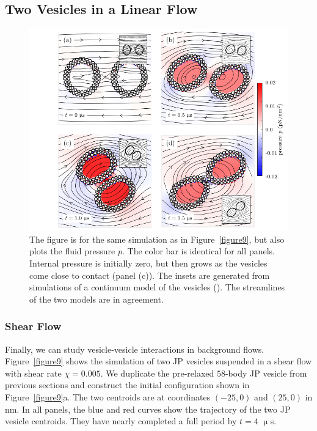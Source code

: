 \documentclass[lineno]{jfm}
\begin{document}
\subsection{Two Vesicles in a Linear Flow}
\begin{figure}
  \centering
\includegraphics[width=\textwidth]{Figure10_Wrapper.pdf}  
  \caption{\label{figure10} 
  The figure is for the same simulation as in Figure~\ref{figure9}, 
  but also plots the fluid pressure $p$. The color bar is identical for all panels. 
  Internal pressure is initially zero, but then grows as the vesicles come close to contact  (panel (c)).
  The insets are generated from simulations of a continuum model of the vesicles (\cite{qua-vee-you2019}). 
  The streamlines of the two models are in agreement.}
\end{figure}

\subsubsection{Shear Flow}
Finally, we can study vesicle-vesicle interactions in background flows. 
Figure~\ref{figure9} shows the simulation of two JP vesicles suspended
in a shear flow with shear rate $\chi=0.005$. We duplicate the
pre-relaxed $58$-body JP vesicle from previous sections and construct the
initial configuration shown in Figure~\ref{figure9}a. The two centroids
are at coordinates $(-25,0)$ and $(25,0)$ in nm. In all panels, the blue and red
curves show the trajectory of the two JP vesicle centroids. They have
nearly completed a full period by $t=4$ $\upmu$s. 
\end{document}
